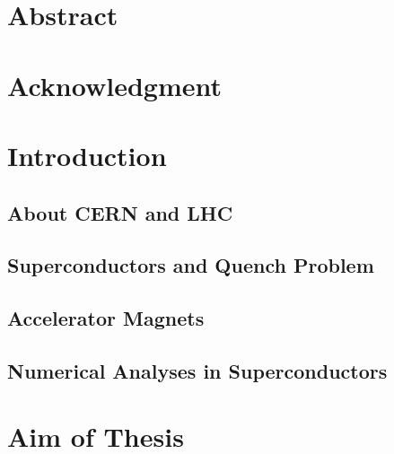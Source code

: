\documentclass[11pt,a4paper]{report}
\begin{document}


\clearpage\thispagestyle{empty}
\chapter*{Abstract}
\thispagestyle{empty}


\clearpage\thispagestyle{empty}
\chapter*{Acknowledgment}
\thispagestyle{empty}


\clearpage
\setcounter{page}{1}
\tableofcontents
\clearpage

\chapter{Introduction}
\label{chapter: introduction}

\section{About CERN and LHC}
\label{section: about cern}


\section{Superconductors and Quench Problem}
\label{section: superconductors}


\section{Accelerator Magnets}
\label{section: accelerator_magnets}


\section{Numerical Analyses in Superconductors}
\label{section: numerical_analyses_in_superconductors}


\clearpage \thispagestyle{empty}
\chapter{Aim of Thesis}
\label{chapter: aim_thesis}
\end{document}
